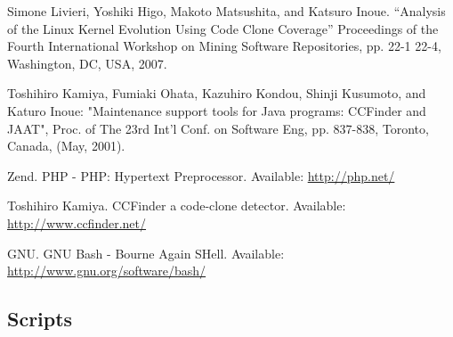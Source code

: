 \documentclass[a4paper,twoside,11pt]{article}
\begin{document}
\newpage
\begin{thebibliography}{9}
Simone Livieri, Yoshiki Higo, Makoto Matsushita, and Katsuro Inoue. ``Analysis of the Linux Kernel Evolution Using Code Clone Coverage'' Proceedings of the Fourth International Workshop on Mining Software Repositories,  pp. 22-1 22-4, Washington, DC, USA, 2007.

Toshihiro Kamiya, Fumiaki Ohata, Kazuhiro Kondou, Shinji Kusumoto, and Katuro Inoue: "Maintenance support tools for Java programs: CCFinder and JAAT", Proc. of The 23rd Int'l Conf. on Software Eng, pp. 837-838, Toronto, Canada, (May, 2001).

Zend. PHP - PHP: Hypertext Preprocessor. Available: \url{http://php.net/}

Toshihiro Kamiya. CCFinder a code-clone detector. Available: \url{http://www.ccfinder.net/}

GNU. GNU Bash - Bourne Again SHell. Available: \url{http://www.gnu.org/software/bash/}  

\end{thebibliography}

\newpage

\begin{appendices}
\section{Scripts}
\label{app:scripts}




\newpage



\newpage



\newpage







\newpage



\end{appendices}
\end{document}
